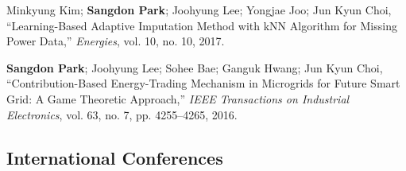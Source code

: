 \documentclass[11pt,a4paper]{article}
\begin{document}
\begin{enumerate}[label={[{\arabic*}]}, leftmargin=*, itemsep=0.3em]
\item Minkyung Kim; \textbf{Sangdon Park}; Joohyung Lee; Yongjae Joo; Jun Kyun Choi, ``Learning-Based Adaptive Imputation Method with kNN Algorithm for Missing Power Data,'' \textit{Energies}, vol. 10, no. 10, 2017.

\item \textbf{Sangdon Park}; Joohyung Lee; Sohee Bae; Ganguk Hwang; Jun Kyun Choi, ``Contribution-Based Energy-Trading Mechanism in Microgrids for Future Smart Grid: A Game Theoretic Approach,'' \textit{IEEE Transactions on Industrial Electronics}, vol. 63, no. 7, pp. 4255--4265, 2016.
\end{enumerate}

\subsection{International Conferences}
\end{document}
